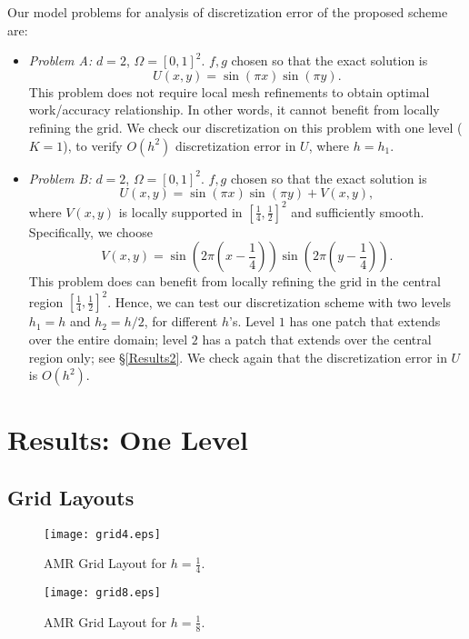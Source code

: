 \documentclass[12pt]{article}
\def \be {\begin{equation}}
\def \ee {\end{equation}}
\def \bi {\begin{itemize}}
\def \ei {\end{itemize}}
\begin{document}
Our model problems for analysis of discretization error of the proposed scheme
are:
\bi
\item \emph{Problem A:} $d = 2$, $\Omega = [0,1]^2$.
$f,g$ chosen so that the exact solution is
\be
U(x,y) = \sin\left(\pi x\right) \sin\left(\pi y\right).
\ee
This problem does not require local mesh refinements to obtain optimal
work/accuracy relationship. In other words, it cannot benefit from locally
refining the grid. We check our discretization on this problem with one level
($K=1$), to verify $O(h^2)$ discretization error in $U$, where $h=h_1$.

\item \emph{Problem B:} $d = 2$, $\Omega = [0,1]^2$.
$f,g$ chosen so that the exact solution is
\be
U(x,y) = \sin(\pi x) \sin(\pi y) + V(x,y),
\ee
where $V(x,y)$ is locally supported in $[\frac14,\frac12]^2$ and sufficiently
smooth. Specifically, we choose
\be
V(x,y) = \sin\left(2 \pi (x-\frac14)\right)
\sin\left(2 \pi (y - \frac14)\right).
\ee
This problem does can benefit from locally refining the grid in the central
region $[\frac14,\frac12]^2$. Hence, we can test our discretization scheme
with two levels $h_1=h$ and $h_2=h/2$, for different $h$'s. Level $1$ has
one patch that extends over the entire domain; level $2$ has a patch that
extends over the central region only; see \S \ref{Results2}. We check again
that the discretization error in $U$ is $O(h^2)$.
\ei

\newpage
\section{Results: One Level}
\label{Results1}

\subsection{Grid Layouts}

\begin{figure}[htbp]
\begin{center}
\texttt{[image: grid4.eps]}
\end{center}
\caption{AMR Grid Layout for $h = \frac14$.}
\label{grid4}
\end{figure}  

\begin{figure}[htbp]
\begin{center}
\texttt{[image: grid8.eps]}
\end{center}
\caption{AMR Grid Layout for $h = \frac18$.}
\label{grid8}
\end{figure}  
\end{document}
